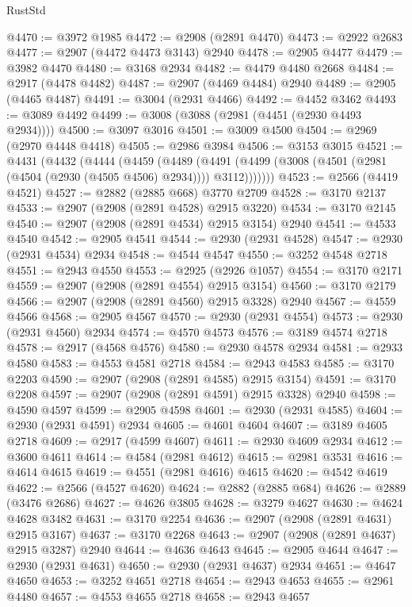 \begin{lexlean}{RustStd}
\begin{coremodule}
@4470 := @3972 @1985
@4472 := @2908 (@2891 @4470)
@4473 := @2922 @2683
@4477 := @2907 (@4472 @4473 @3143) @2940
@4478 := @2905 @4477
@4479 := @3982 @4470
@4480 := @3168 @2934
@4482 := @4479 @4480 @2668
@4484 := @2917 (@4478 @4482)
@4487 := @2907 (@4469 @4484) @2940
@4489 := @2905 (@4465 @4487)
@4491 := @3004 (@2931 @4466)
@4492 := @4452 @3462
@4493 := @3089 @4492
@4499 := @3008 (@3088 (@2981 (@4451 (@2930 @4493 @2934))))
@4500 := @3097 @3016
@4501 := @3009 @4500
@4504 := @2969 (@2970 @4448 @4418)
@4505 := @2986 @3984
@4506 := @3153 @3015
@4521 := @4431
    (@4432
      (@4444
        (@4459
          (@4489
            (@4491 (@4499 (@3008 (@4501 (@2981 (@4504 (@2930 (@4505 @4506) @2934)))) @3112)))))))
@4523 := @2566 (@4419 @4521)
@4527 := @2882 (@2885 @668) @3770 @2709
@4528 := @3170 @2137
@4533 := @2907 (@2908 (@2891 @4528) @2915 @3220)
@4534 := @3170 @2145
@4540 := @2907 (@2908 (@2891 @4534) @2915 @3154) @2940
@4541 := @4533 @4540
@4542 := @2905 @4541
@4544 := @2930 (@2931 @4528)
@4547 := @2930 (@2931 @4534) @2934
@4548 := @4544 @4547
@4550 := @3252 @4548 @2718
@4551 := @2943 @4550
@4553 := @2925 (@2926 @1057)
@4554 := @3170 @2171
@4559 := @2907 (@2908 (@2891 @4554) @2915 @3154)
@4560 := @3170 @2179
@4566 := @2907 (@2908 (@2891 @4560) @2915 @3328) @2940
@4567 := @4559 @4566
@4568 := @2905 @4567
@4570 := @2930 (@2931 @4554)
@4573 := @2930 (@2931 @4560) @2934
@4574 := @4570 @4573
@4576 := @3189 @4574 @2718
@4578 := @2917 (@4568 @4576)
@4580 := @2930 @4578 @2934
@4581 := @2933 @4580
@4583 := @4553 @4581 @2718
@4584 := @2943 @4583
@4585 := @3170 @2203
@4590 := @2907 (@2908 (@2891 @4585) @2915 @3154)
@4591 := @3170 @2208
@4597 := @2907 (@2908 (@2891 @4591) @2915 @3328) @2940
@4598 := @4590 @4597
@4599 := @2905 @4598
@4601 := @2930 (@2931 @4585)
@4604 := @2930 (@2931 @4591) @2934
@4605 := @4601 @4604
@4607 := @3189 @4605 @2718
@4609 := @2917 (@4599 @4607)
@4611 := @2930 @4609 @2934
@4612 := @3600 @4611
@4614 := @4584 (@2981 @4612)
@4615 := @2981 @3531
@4616 := @4614 @4615
@4619 := @4551 (@2981 @4616) @4615
@4620 := @4542 @4619
@4622 := @2566 (@4527 @4620)
@4624 := @2882 (@2885 @684)
@4626 := @2889 (@3476 @2686)
@4627 := @4626 @3805
@4628 := @3279 @4627
@4630 := @4624 @4628 @3482
@4631 := @3170 @2254
@4636 := @2907 (@2908 (@2891 @4631) @2915 @3167)
@4637 := @3170 @2268
@4643 := @2907 (@2908 (@2891 @4637) @2915 @3287) @2940
@4644 := @4636 @4643
@4645 := @2905 @4644
@4647 := @2930 (@2931 @4631)
@4650 := @2930 (@2931 @4637) @2934
@4651 := @4647 @4650
@4653 := @3252 @4651 @2718
@4654 := @2943 @4653
@4655 := @2961 @4480
@4657 := @4553 @4655 @2718
@4658 := @2943 @4657

\end{coremodule}
\end{lexlean}
